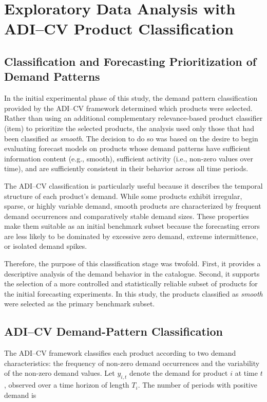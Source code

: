 \chapter{Exploratory Data Analysis with ADI--CV Product Classification}
\section{Classification and Forecasting Prioritization of Demand Patterns }

\label{sec:adi_cv_forecasting_prioritization}

In the initial experimental phase of this study, the demand pattern classification provided by the ADI--CV framework determined which products were selected. Rather than using an additional complementary relevance-based product classifier (item) to prioritize the selected products, the analysis used only those that had been classified as \textit{smooth}. The decision to do so was based on the desire to begin evaluating forecast models on products whose demand patterns have sufficient information content (e.g., smooth), sufficient activity (i.e., non-zero values over time), and are sufficiently consistent in their behavior across all time periods.

The ADI--CV classification is particularly useful because it describes the temporal structure of each product's demand. While some products exhibit irregular, sparse, or highly variable demand, smooth products are characterized by frequent demand occurrences and comparatively stable demand sizes. These properties make them suitable as an initial benchmark subset because the forecasting errors are less likely to be dominated by excessive zero demand, extreme intermittence, or isolated demand spikes.

Therefore, the purpose of this classification stage was twofold. First, it provides a descriptive analysis of the demand behavior in the catalogue. Second, it supports the selection of a more controlled and statistically reliable subset of products for the initial forecasting experiments. In this study, the products classified as \textit{smooth} were selected as the primary benchmark subset.

\section{ADI--CV Demand-Pattern Classification}
\label{sec:adi_cv_classification}

The ADI--CV framework classifies each product according to two demand characteristics: the frequency of non-zero demand occurrences and the variability of the non-zero demand values. Let \(y_{i,t}\) denote the demand for product \(i\) at time \(t\), observed over a time horizon of length \(T_i\). The number of periods with positive demand is 

